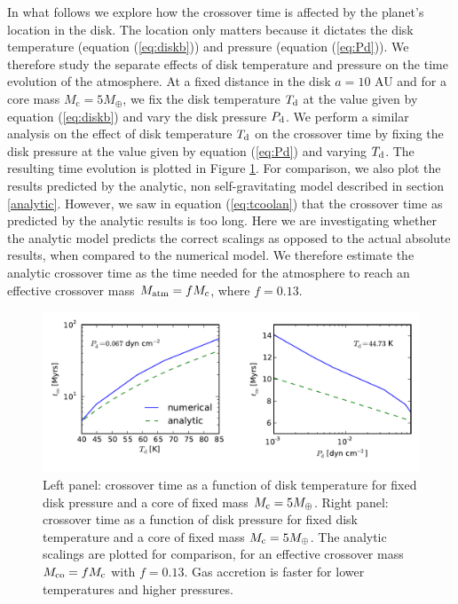\documentclass[apj]{emulateapj}
\begin{document}
In what follows we explore how the crossover time is affected by the planet's location in the disk. The location only matters because it dictates the disk temperature (equation (\ref{eq:diskb})) and pressure (equation (\ref{eq:Pd})). We therefore study the separate effects of disk temperature and pressure on the time evolution of the atmosphere. At a fixed distance in the disk $a=10$ AU and for a core mass $M_{\mathrm{c}}=5 M_{\oplus}$, we fix the disk temperature $T_{\rm{d}}$ at the value given by equation (\ref{eq:diskb}) and vary the disk pressure $P_{\rm{d}}$. We perform a similar analysis on the effect of disk temperature $T_{\rm{d}}$ on the crossover time by fixing the disk pressure at the value given by equation (\ref{eq:Pd}) and varying $T_{\rm{d}}$. The resulting time evolution is plotted in Figure \ref{fig:TPeffects}. For comparison, we also plot the results predicted by the analytic, non self-gravitating model described in section \ref{analytic}. However, we saw in equation (\ref{eq:tcoolan}) that the crossover time as predicted by the analytic results is too long. Here we are investigating whether the analytic model predicts the correct scalings as opposed to the actual absolute results, when compared to the numerical model. We therefore estimate the analytic crossover time as the time needed for the atmosphere to reach an effective crossover mass $M_{\rm{atm}}=f M_{\rm c}$, where $f = 0.13$.

\begin{figure}[tb]
\centering
\includegraphics[width=1.\textwidth]{../../figs/ModelAtmospheres/RadSelfGravPoly/PaperFigs/TdPd_effect.pdf}
\caption{Left panel: crossover time as a function of disk temperature for fixed disk pressure and a core of fixed mass $M_{\rm c}=5 M_{\oplus}$. Right panel: crossover time as a function of disk pressure for fixed disk temperature and a core of fixed mass  $M_{\rm c}=5 M_{\oplus}$. The analytic scalings are plotted for comparison, for an effective crossover mass $M_{\rm{co}}=f M_{\rm c}$ with $f=0.13$. Gas accretion is faster for lower temperatures and higher pressures.} 
\label{fig:TPeffects}
\end{figure}
\end{document}
